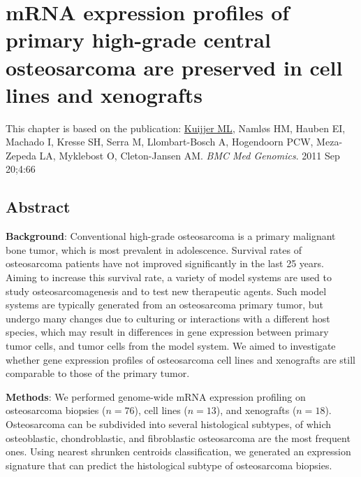 

%


\chapter{mRNA expression profiles of primary high-grade
central osteosarcoma are preserved in cell lines
and xenografts}\label{ch3}
\thispagestyle{empty}				%

\vfill

\vspace{0.5cm}
This chapter is based on the publication:
\underline{Kuijjer ML}, Naml{\o}s HM, Hauben EI, Machado I, Kresse SH, Serra M, Llombart-Bosch A, Hogendoorn PCW, Meza-Zepeda LA, Myklebost O, Cleton-Jansen AM. {\it BMC Med Genomics}. 2011 Sep 20;4:66

\newpage


\section{Abstract}\label{abstract3}
\textbf{Background}: Conventional high-grade osteosarcoma is a primary malignant bone tumor, which is most prevalent
in adolescence. Survival rates of osteosarcoma patients have not improved significantly in the last 25 years. Aiming
to increase this survival rate, a variety of model systems are used to study osteosarcomagenesis and to test new
therapeutic agents. Such model systems are typically generated from an osteosarcoma primary tumor, but undergo
many changes due to culturing or interactions with a different host species, which may result in differences in
gene expression between primary tumor cells, and tumor cells from the model system. We aimed to investigate
whether gene expression profiles of osteosarcoma cell lines and xenografts are still comparable to those of the
primary tumor.

\textbf{Methods}: We performed genome\hyp{}wide mRNA expression profiling on osteosarcoma biopsies ($n=76$), cell lines ($n=13$), and xenografts ($n=18$). Osteosarcoma can be subdivided into several histological subtypes, of which
osteoblastic, chondroblastic, and fibroblastic osteosarcoma are the most frequent ones. Using nearest shrunken
centroids classification, we generated an expression signature that can predict the histological subtype of
osteosarcoma biopsies.

